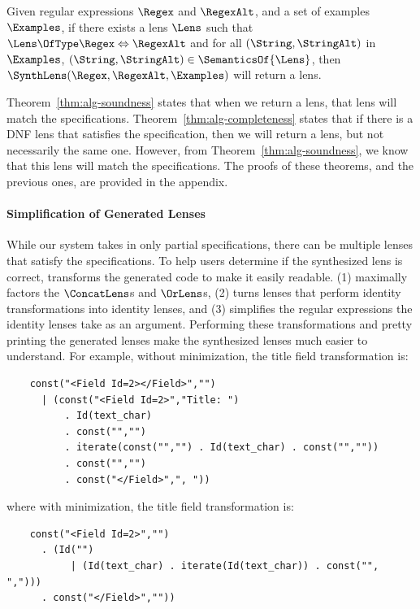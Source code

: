\documentclass[acmsmall,screen]{acmart}
\begin{document}
\begin{theorem}
  \label{thm:alg-completeness}
  Given regular expressions $\Regex$ and $\RegexAlt$, and a set
  of examples $\Examples$, if there exists a lens $\Lens$ such that
  $\Lens \OfType \Regex \Leftrightarrow \RegexAlt$ and for all
  $(\String,\StringAlt)$ in $\Examples$, $(\String,\StringAlt) \in
  \SemanticsOf{\Lens}$, then $\SynthLens(\Regex,\RegexAlt,\Examples)$ will
  return a lens.
\end{theorem}

Theorem~\ref{thm:alg-soundness} states that when we return a lens, that 
lens will match the specifications.  Theorem~\ref{thm:alg-completeness} states
that if there is a DNF lens that satisfies the specification, then we will
return a lens, but not necessarily the same one.  However, from
Theorem~\ref{thm:alg-soundness}, we know that this lens will match the
specifications.  
\ifappendices
The proofs of these theorems, and the previous ones, are provided in the appendix.
\else
\fi

\paragraph*{Simplification of Generated Lenses}
While our system takes in only partial specifications, there can be multiple
lenses that satisfy the specifications.  To help users
determine if the synthesized lens is correct, \Optician{} transforms the
generated code to make it easily readable.  \Optician{} (1) maximally 
factors the $\ConcatLens$s and $\OrLens$s, (2) turns lenses that perform identity
transformations into identity lenses, and (3) simplifies the regular expressions
the identity lenses take as an argument.  Performing these transformations and
pretty printing the generated lenses make the synthesized lenses much easier to
understand.  For example, without minimization, the title field transformation
is:
%
\begin{lstlisting}
    const("<Field Id=2></Field>","")
      | (const("<Field Id=2>","Title: ")
          . Id(text_char)
          . const("","")
          . iterate(const("","") . Id(text_char) . const("",""))
          . const("","")
          . const("</Field>",", "))
\end{lstlisting}
%
where with minimization, the title field transformation is:
%
\begin{lstlisting}
    const("<Field Id=2>","")
      . (Id("")
           | (Id(text_char) . iterate(Id(text_char)) . const("", ",")))
      . const("</Field>",""))
\end{lstlisting}
%
\end{document}

